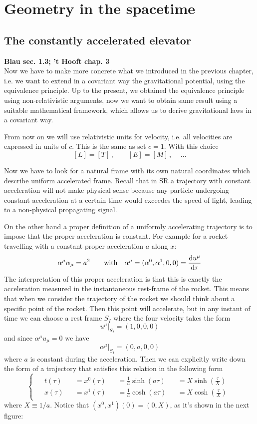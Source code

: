 \documentclass[../main/main.tex]{subfiles}
\begin{document}
\chapter{Geometry in the spacetime}

\section{The constantly accelerated elevator}
\textbf{Blau sec. 1.3; 't Hooft chap. 3}\\

Now we have to make more concrete what we introduced in the previous chapter, i.e. we want to extend in a covariant way the gravitational potential, using the equivalence principle. Up to the present, we obtained the equivalence principle using non-relativistic arguments, now we want to obtain same result using a suitable mathematical framework, which allows us to derive gravitational laws in a covariant way. 

From now on we will use relativistic units for velocity, i.e. all velocities are expressed in units of $c$. This is the same as set $c=1$. With this choice
\[[L]=[T]\,,\qquad [E]=[M]\,,\,\quad\dots\]

Now we have to look for a natural frame with its own natural coordinates which describe uniform accelerated frame. Recall that in SR a trajectory with constant acceleration will not make physical sense because any particle undergoing constant acceleration at a certain time would exceedes the speed of light, leading to a non-physical propagating signal. 

On the other hand a proper definition of a uniformly accelerating trajectory is to impose that the proper acceleration is constant. For example for a rocket travelling with a constant proper acceleration $a$ along $ x$:
\[\alpha^\mu\alpha_\mu=a^2\qquad\text{with}\quad \alpha^\mu=(\alpha^0,\alpha^1,0,0)=\frac{\textup{d} u^\mu}{\textup{d}\tau}\]
The interpretation of this proper acceleration is that this is exactly the acceleration measured in the instantaneous rest-frame of the rocket. This means that when we consider the trajectory of the rocket we should think about a specific point of the rocket. Then this point will accelerate, but in any instant of time we can choose a rest frame $S_I$ where the four velocity takes the form
\[u^\mu\vert_{S_I}=(1,0,0,0)\]
and since $\alpha^\mu u_\mu=0$ we have
\[\alpha^\mu|_{S_I}=(0,a,0,0)\]
where $a$ is constant during the acceleration. 
%
Then we can explicitly write down the form of a trajectory that satisfies this relation in the following form
\begin{equation}\label{eqn:const-accell-solut}\begin{cases}\begin{alignedat}{4}
&t(\tau)&&=x^0(\tau)&&=\frac1a\sinh(a\tau)&&=X\sinh(\frac\tau X)\\
&x(\tau)&&=x^1(\tau)&&=\frac1a\cosh(a\tau)&&=X\cosh(\frac\tau X)
\end{alignedat}\end{cases}\end{equation}
where $X\equiv1/a$. Notice that $(x^0,x^1)(0)=(0,X)$, as it's shown in the next figure:
\end{document}
